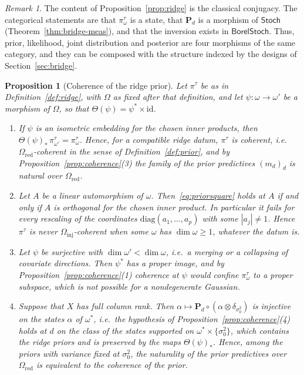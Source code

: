 \documentclass[11pt,a4paper]{article}
\theoremstyle{plain}
\newtheorem{proposition}[theorem]{Proposition}
\theoremstyle{definition}
\theoremstyle{remark}
\newtheorem{remark}[theorem]{Remark}
\newcommand{\cat}[1]{\mathsf{#1}}
\newcommand{\catO}{\cat{\Omega}}
\newcommand{\Stoch}{\cat{Stoch}}
\newcommand{\id}{\mathrm{id}}
\newcommand{\BorelStoch}{\cat{BorelStoch}}
\begin{document}
\begin{remark}\label{rem:ridge}
The content of Proposition~\ref{prop:ridge} is the classical conjugacy. The
categorical statements are that $\pi^{\tau}_{\omega}$ is a state, that
$\mathbf{P}_{d}$ is a morphism of $\Stoch$ (Theorem~\ref{thm:bridge-meas}), and
that the inversion exists in $\BorelStoch$. Thus, prior, likelihood, joint
distribution and posterior are four morphisms of the same category, and they
can be composed with the structure indexed by the designs of
Section~\ref{sec:bridge}.
\end{remark}

\begin{proposition}[Coherence of the ridge prior]\label{prop:ridgecoherence}
Let $\pi^{\tau}$ be as in Definition~\ref{def:ridge}, with $\catO$ as fixed
after that definition, and let
$\psi \colon \omega \to \omega'$ be a morphism of $\catO$, so that
$\Theta(\psi) = \psi^{*}\times\id$.
\begin{enumerate}
\item If $\psi$ is an isometric embedding for the chosen inner products, then
$\Theta(\psi)_{*}\,\pi^{\tau}_{\omega'} = \pi^{\tau}_{\omega}$. Hence, for a
compatible ridge datum, $\pi^{\tau}$ is coherent, i.e.\
$\catO_{\mathrm{red}}$-coherent in the sense of Definition~\ref{def:prior},
and by Proposition~\ref{prop:coherence}(3) the family of the prior predictives
$(m_{d})_{d}$ is natural over $\catO_{\mathrm{red}}$.
\item Let $A$ be a linear automorphism of $\omega$.
Then~\eqref{eq:priorsquare} holds at $A$ if and only if $A$ is orthogonal for
the chosen inner product. In particular it fails for every rescaling of the
coordinates $\mathrm{diag}(a_{1},\dots,a_{p})$ with some $|a_{j}| \neq 1$.
Hence $\pi^{\tau}$ is never $\catO_{\mathrm{inj}}$-coherent when some $\omega$
has $\dim\omega \ge 1$, whatever the datum is.
\item Let $\psi$ be surjective with $\dim\omega' < \dim\omega$, i.e.\ a merging
or a collapsing of covariate directions. Then $\psi^{*}$ has a proper image,
and by Proposition~\ref{prop:coherence}(1) coherence at $\psi$ would confine
$\pi^{\tau}_{\omega}$ to a proper subspace, which is not possible for a
nondegenerate Gaussian.
\item Suppose that $X$ has full column rank. Then
$\alpha \mapsto \mathbf P_{d}\circ(\alpha\otimes\delta_{\sigma_{0}^{2}})$ is
injective on the states $\alpha$ of $\omega^{*}$, i.e.\ the hypothesis of
Proposition~\ref{prop:coherence}(4) holds at $d$ on the class of the states
supported on $\omega^{*}\times\{\sigma_{0}^{2}\}$, which contains the ridge
priors and is preserved by the maps $\Theta(\psi)_{*}$. Hence, among the
priors with variance fixed at $\sigma_{0}^{2}$, the naturality of the prior
predictives over $\catO_{\mathrm{red}}$ is equivalent to the coherence of the
prior.
\end{enumerate}
\end{proposition}
\end{document}
